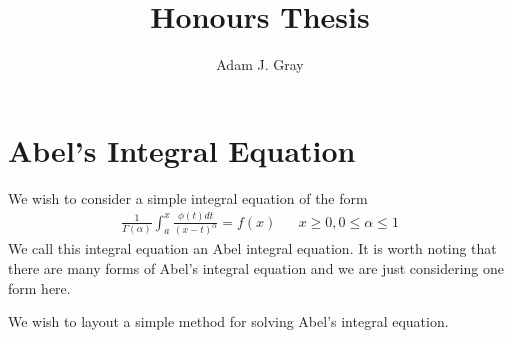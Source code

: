 \documentclass{unswmaths}
\author{Adam J. Gray}
\title{Honours Thesis}
\begin{document}
\unswtitle

\setlength\parindent{0pt}
\setlength{\parskip}{5mm plus4mm minus3mm}

\section*{Abel's Integral Equation}

We wish to consider a simple integral equation of the form
\begin{align}
	\label{eqn:abel}
	\frac{1}{\Gamma(\alpha)}\int_a^x \frac{\phi(t)dt}{(x-t)^\alpha} = f(x) 	& & x \geq 0, 0 \leq \alpha \leq 1
\end{align}
We call this integral equation an Abel integral equation. It is worth noting that there are many forms of Abel's integral
equation and we are just considering one form here.

We wish to layout a simple method for solving Abel's integral equation.
\end{document}
